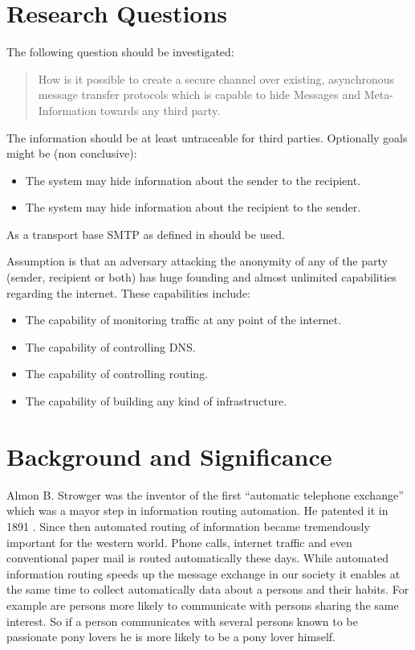 \documentclass[twocolumn,a4paper,10pt,english]{scrartcl}
\newenvironment{myitemize}{\begin{itemize}\setlength{\itemsep}{0em}}{\end{itemize}}
\begin{document}
\section{Research Questions}
The following question should be investigated: 
\begin{quote}
How is it possible to create a secure channel over existing, asynchronous message transfer protocols which is capable to hide Messages and Meta-Information towards any third party. 
\end{quote}
The information should be at least untraceable for third parties. Optionally goals might be (non conclusive):
\begin{myitemize}
\item The system may hide information about the sender to the recipient.
\item The system may hide information about the recipient to the sender. 
\end{myitemize}
As a transport base SMTP as defined in \cite{RFC5321} should be used. \par
Assumption is that an adversary attacking the anonymity of any of the party (sender, recipient or both) has huge founding and almost unlimited capabilities regarding the internet. These capabilities include:
\begin{myitemize}
\item The capability of monitoring traffic at any point of the internet.
\item The capability of controlling DNS.
\item The capability of controlling routing.
\item The capability of building any kind of infrastructure.
\end{myitemize}

\section{Background and Significance}
Almon B. Strowger was the inventor of the first ``automatic telephone exchange'' which was a mayor step in information routing automation. He patented it in 1891 \cite{strowger}. Since then automated routing of information became tremendously important for the western world. Phone calls, internet traffic and even conventional paper mail is routed automatically these days. While automated information routing speeds up the message exchange in our society it enables at the same time to collect automatically data about a persons and their habits. For example are persons more likely to communicate with persons sharing the same interest. So if a person communicates with several persons known to be passionate pony lovers he is more likely to be a pony lover himself.\par
\end{document}
